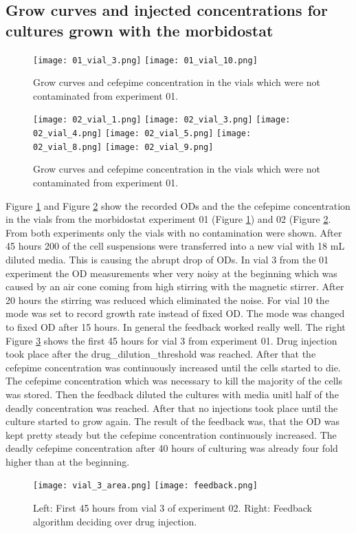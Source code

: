 \subsection{Grow curves and injected concentrations for cultures grown with the morbidostat}
\begin{figure}
	\texttt{[image: 01\_vial\_3.png]}
	\texttt{[image: 01\_vial\_10.png]}
	\caption{Grow curves and cefepime concentration in the vials which were not contaminated from experiment 01.}
	\label{figure:01_vials}
\end{figure}

\begin{figure}	
	\texttt{[image: 02\_vial\_1.png]}
	\texttt{[image: 02\_vial\_3.png]}
	\texttt{[image: 02\_vial\_4.png]}
	\texttt{[image: 02\_vial\_5.png]}
	\texttt{[image: 02\_vial\_8.png]}
	\texttt{[image: 02\_vial\_9.png]}	
	\caption{Grow curves and cefepime concentration in the vials which were not contaminated from experiment 01.}
	\label{figure:02_vials}
\end{figure}
Figure \ref{figure:01_vials} and Figure \ref{figure:02_vials} show the recorded ODs and the the cefepime concentration in the vials from the morbidostat experiment 01 (Figure \ref{figure:01_vials}) and 02 (Figure \ref{figure:02_vials}. From both experiments only the vials with no contamination were shown. After 45 hours 200 \textmu of the cell suspensions were transferred into a new vial with 18 mL diluted media. This is causing the abrupt drop of ODs. In vial 3 from the 01 experiment the OD measurements wher very noisy at the beginning which was caused by an air cone coming from high stirring with the magnetic stirrer. After 20 hours the stirring was reduced which eliminated the noise. For vial 10 the mode was set to record growth rate instead of fixed OD. The mode was changed to fixed OD after 15 hours. 
In general the feedback worked really well. The right Figure \ref{figure:vial_3_area} shows the first 45 hours for vial 3 from experiment 01. Drug injection took place after the drug\_dilution\_threshold was reached. After that the cefepime concentration was continuously increased until the cells started to die. The cefepime concentration which was necessary to kill the majority of the cells was stored. Then the feedback diluted the cultures with media unitl half of the deadly concentration was reached. After that no injections took place until the culture started to grow again. The result of the feedback was, that the OD was kept pretty steady but the cefepime concentration continuously increased. The deadly cefepime concentration after 40 hours of culturing was already four fold higher than at the beginning. 
\begin{figure}
	\texttt{[image: vial\_3\_area.png]}
	\texttt{[image: feedback.png]}
	\caption{Left: First 45 hours from vial 3 of experiment 02. Right: Feedback algorithm deciding over drug injection.}
	\label{figure:vial_3_area}
\end{figure}
